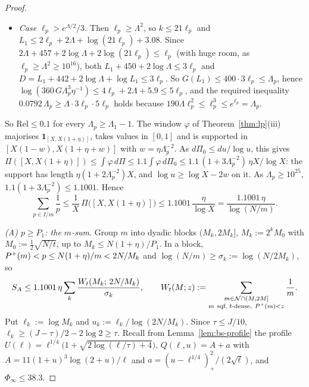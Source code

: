 \begin{proof}
\begin{itemize}
\[\begin{aligned}
    &<0.0792\cdot76\,\Lambda^3r=0.0792\,\Lambda_p ,
  \end{aligned}
  \]
  which is the required inequality.
\item \emph{Case $\ell_p>e^{\Lambda/2}/3$.} Then $\ell_p\ge\Lambda^2$, so $k\le21\ell_p$ and
  $L_1\le2\ell_p+2\Lambda+\log(21\ell_p)+3.08$. Since $2\Lambda+457+2\log\Lambda+2\log(21\ell_p)\le\ell_p$ (with huge room, as
  $\ell_p\ge\Lambda^2\ge10^{16}$), both $L_1+450+2\log\Lambda\le3\ell_p$ and $D=L_1+442+2\log\Lambda+\log L_1\le3\ell_p$. So
  $G(L_1)\le400\cdot3\ell_p\le\Lambda_p$, hence $\log(360\,G\Lambda_p^3\eta^{-1})\le4\ell_p+2\Lambda+5.9\le5\ell_p$, and the
  required inequality $0.0792\,\Lambda_p\ge\Lambda\cdot3\ell_p\cdot5\ell_p$ holds because
  $190\Lambda\ell_p^2\le\ell_p^3\le e^{\ell_p}=\Lambda_p$.
\end{itemize}
So $\mathrm{Rel}\le0.1$ for every $\Lambda_p\ge\Lambda_1-1$. The window $\varphi$ of Theorem~\ref{thm:lp}(iii) majorises
$\mathbf 1_{[X,X(1+\eta)]}$, takes values in $[0,1]$ and is supported in $[X(1-w),X(1+\eta+w)]$ with $w=\eta\Lambda_p^{-2}$. As
$d\Pi_0\le du/\log u$, this gives
$\Pi([X,X(1+\eta)])\le\int\varphi\,d\Pi\le1.1\int\varphi\,d\Pi_0\le1.1\,(1+3\Lambda_p^{-2})\,\eta X/\log X$: the support has
length $\eta(1+2\Lambda_p^{-2})X$, and $\log u\ge\log X-2w$ on it. As
$\Lambda_p\ge10^{25}$, $1.1(1+3\Lambda_p^{-2})\le1.1001$. Hence
\[
  \sum_{p\in I/m}\frac1p\le\frac1X\,\Pi\bigl([X,X(1+\eta)]\bigr)\le1.1001\,\frac{\eta}{\log X}=\frac{1.1001\,\eta}{\log(N/m)} .
\]

\emph{(A) $p\ge P_1$: the $m$-sum.} Group $m$ into dyadic blocks $(M_k,2M_k]$, $M_k:=2^kM_0$ with $M_0:=\frac12\sqrt{N/t}$,
up to $M_k\le N(1+\eta)/P_1$. In a block, $P^{+}(m)<p\le N(1+\eta)/m<2N/M_k$ and $\log(N/m)\ge\sigma_k:=\log(N/2M_k)$, so
\[
  S_A\le1.1001\,\eta\sum_k\frac{W_t(M_k;\,2N/M_k)}{\sigma_k},\qquad
  W_t(M;z):=\sum_{\substack{m\in\mathcal{N}\cap(M,2M]\\ m\ \text{sqf, $t$-dense},\ P^{+}(m)<z}}\frac1m .
\]
Put $\ell_k:=\log M_k$ and $u_k:=\ell_k/\log(2N/M_k)$. Since $\tau\le J/10$, $\ell_k\ge(J-\tau)/2-2\log2\ge\tau$. Recall from
Lemma~\ref{lem:bs-profile} the profile $U(\ell)=\ell^{1/4}\bigl(1+\sqrt{2\log(\ell/\tau)+4}\bigr)$,
$Q(\ell,u)=A+a$ with $A=11(1+u)^3\log(2+u)/\ell$ and $a=(u-\ell^{1/4})_+^2/(2\sqrt\ell)$, and $\Phi_\infty\le38.3$.


\end{proof}

